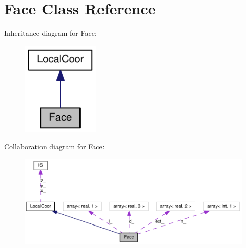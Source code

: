 \hypertarget{classFace}{
\section{Face Class Reference}
\label{classFace}
}
Inheritance diagram for Face:\nopagebreak
\begin{figure}[H]
\begin{center}
\leavevmode
\includegraphics[width=105pt]{classFace__inherit__graph}
\end{center}
\end{figure}
Collaboration diagram for Face:\nopagebreak
\begin{figure}[H]
\begin{center}
\leavevmode
\includegraphics[width=400pt]{classFace__coll__graph}
\end{center}
\end{figure}
